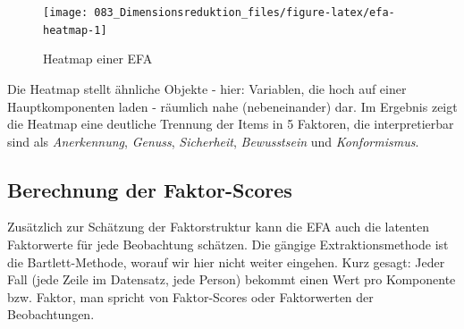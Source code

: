 \documentclass[12pt,ngerman,]{book}
\makeatletter
\newenvironment{Shaded}{\begin{snugshade}}{\end{snugshade}}
\newcommand{\KeywordTok}[1]{\textcolor[rgb]{0.13,0.29,0.53}{\textbf{#1}}}
\newcommand{\DataTypeTok}[1]{\textcolor[rgb]{0.13,0.29,0.53}{#1}}
\newcommand{\DecValTok}[1]{\textcolor[rgb]{0.00,0.00,0.81}{#1}}
\newcommand{\FloatTok}[1]{\textcolor[rgb]{0.00,0.00,0.81}{#1}}
\newcommand{\StringTok}[1]{\textcolor[rgb]{0.31,0.60,0.02}{#1}}
\newcommand{\CommentTok}[1]{\textcolor[rgb]{0.56,0.35,0.01}{\textit{#1}}}
\newcommand{\OtherTok}[1]{\textcolor[rgb]{0.56,0.35,0.01}{#1}}
\newcommand{\OperatorTok}[1]{\textcolor[rgb]{0.81,0.36,0.00}{\textbf{#1}}}
\newcommand{\NormalTok}[1]{#1}
\newenvironment{kframe}{%
\medskip{}
\setlength{\fboxsep}{.8em}
 \def\at@end@of@kframe{}%
 \ifinner\ifhmode%
  \def\at@end@of@kframe{\end{minipage}}%
  \begin{minipage}{\columnwidth}%
 \fi\fi%
 \def\FrameCommand##1{\hskip\@totalleftmargin \hskip-\fboxsep
 \colorbox{shadecolor}{##1}\hskip-\fboxsep
     \hskip-\linewidth \hskip-\@totalleftmargin \hskip\columnwidth}%
 \MakeFramed {\advance\hsize-\width
   \@totalleftmargin\z@ \linewidth\hsize
   \@setminipage}}%
 {\par\unskip\endMakeFramed%
 \at@end@of@kframe}
\renewenvironment{Shaded}{\begin{kframe}}{\end{kframe}}
\theoremstyle{definition}
\theoremstyle{definition}
\theoremstyle{remark}
\makeatother
\begin{document}
\begin{Shaded}
\end{Shaded}

\begin{figure}

{\centering \texttt{[image: 083\_Dimensionsreduktion\_files/figure-latex/efa-heatmap-1]} 

}

\caption{Heatmap einer EFA}\label{fig:efa-heatmap}
\end{figure}

Die Heatmap stellt ähnliche Objekte - hier: Variablen, die hoch auf
einer Hauptkomponenten laden - räumlich nahe (nebeneinander) dar. Im
Ergebnis zeigt die Heatmap eine deutliche Trennung der Items in 5
Faktoren, die interpretierbar sind als \emph{Anerkennung},
\emph{Genuss}, \emph{Sicherheit}, \emph{Bewusstsein} und
\emph{Konformismus}.

\subsection{Berechnung der
Faktor-Scores}\label{berechnung-der-faktor-scores}

Zusätzlich zur Schätzung der Faktorstruktur kann die EFA auch die
latenten Faktorwerte für jede Beobachtung schätzen. Die gängige
Extraktionsmethode ist die Bartlett-Methode, worauf wir hier nicht
weiter eingehen. Kurz gesagt: Jeder Fall (jede Zeile im Datensatz, jede
Person) bekommt einen Wert pro Komponente bzw. Faktor, man spricht von
Faktor-Scores oder Faktorwerten der Beobachtungen.
\end{document}
